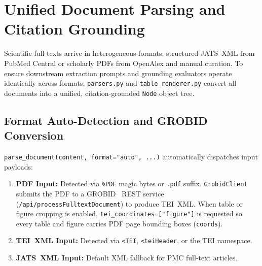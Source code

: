 \section{Unified Document Parsing and Citation Grounding}
\label{sec:parsing}

Scientific full texts arrive in heterogeneous formats: structured JATS~XML from PubMed Central or scholarly PDFs from OpenAlex and manual curation. To ensure downstream extraction prompts and grounding evaluators operate identically across formats, \texttt{parsers.py} and \texttt{table\_renderer.py} convert all documents into a unified, citation-grounded \texttt{Node} object tree.

\subsection{Format Auto-Detection and GROBID Conversion}
\texttt{parse\_document(content, format="auto", ...)} automatically dispatches input payloads:
\begin{enumerate}
    \item \textbf{PDF Input:} Detected via \texttt{\%PDF} magic bytes or \texttt{.pdf} suffix. \texttt{GrobidClient} submits the PDF to a GROBID~\cite{grobid} REST service (\texttt{/api/processFulltextDocument}) to produce TEI~XML. When table or figure cropping is enabled, \texttt{tei\_coordinates=["figure"]} is requested so every table and figure carries PDF page bounding boxes (\texttt{coords}).
    \item \textbf{TEI~XML Input:} Detected via \texttt{<TEI}, \texttt{<teiHeader}, or the TEI namespace.
    \item \textbf{JATS~XML Input:} Default XML fallback for PMC full-text articles.
\end{enumerate}

